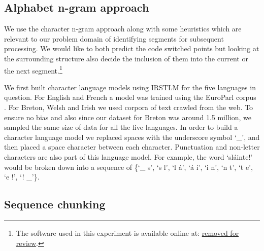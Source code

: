 \documentclass[11pt]{article}
\begin{document}
\subsection{Alphabet n-gram approach}
\label{alphan}

We use the character n-gram approach along with some heuristics which are relevant to our problem domain of identifying
segments for subsequent processing. We would like 
to both predict the code switched points but looking at the surrounding structure also decide the inclusion of them 
into the current or the next segment.\footnote{The software used in this experiment is available online at: \url{removed for review}.}

We first built character language models using IRSTLM \cite{federico08a} for the five languages in question. For English
and French a model was trained using the EuroParl corpus \cite{koehn2005europarl}. 
For Breton, Welsh and Irish we used corpora of text crawled from the web. To ensure no bias and also since our dataset for Breton was around 1.5 million, we sampled the same size of data for all the five languages. 
In order to build a character language model %
we replaced spaces with the underscore 
symbol `\_', and then placed a space character between each character. Punctuation and non-letter characters are also 
part of this language model. For example, the word `sl\'{a}inte!' would be broken down into a sequence 
of \{`\_ s', `s l', `l \'{a}', `\'{a} i', `i n', `n t', `t e', `e !', `! \_'\}. 


\subsection{Sequence chunking}
\label{cschunking}
\end{document}
